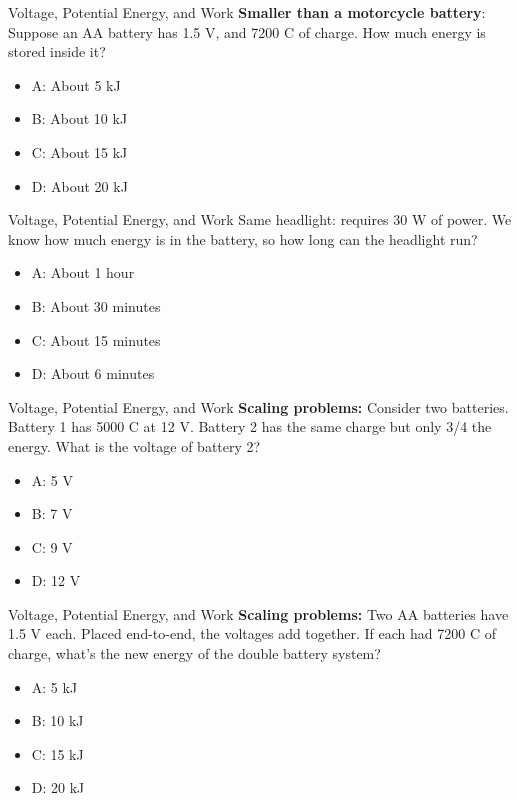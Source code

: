 \documentclass{beamer}
\begin{document}
\begin{frame}{Voltage, Potential Energy, and Work}
\textbf{Smaller than a motorcycle battery}: Suppose an AA battery has 1.5 V, and 7200 C of charge.  How much energy is stored inside it?
\begin{itemize}
\item A: About 5 kJ
\item B: About 10 kJ
\item C: About 15 kJ
\item D: About 20 kJ
\end{itemize}
\end{frame}

\begin{frame}{Voltage, Potential Energy, and Work}
Same headlight: requires 30 W of power.  We know how much energy is in the battery, so how long can the headlight run?
\begin{itemize}
\item A: About 1 hour
\item B: About 30 minutes
\item C: About 15 minutes
\item D: About 6 minutes
\end{itemize}
\end{frame}

\begin{frame}{Voltage, Potential Energy, and Work}
\textbf{Scaling problems:} Consider two batteries.  Battery 1 has 5000 C at 12 V.  Battery 2 has the same charge but only 3/4 the energy.  What is the voltage of battery 2?
\begin{itemize}
\item A: 5 V 
\item B: 7 V
\item C: 9 V
\item D: 12 V
\end{itemize}
\end{frame}

\begin{frame}{Voltage, Potential Energy, and Work}
\textbf{Scaling problems:} Two AA batteries have 1.5 V each.  Placed end-to-end, the voltages add together.  If each had 7200 C of charge, what's the new energy of the double battery system?
\begin{itemize}
\item A: 5 kJ
\item B: 10 kJ
\item C: 15 kJ
\item D: 20 kJ
\end{itemize}
\end{frame}
\end{document}
